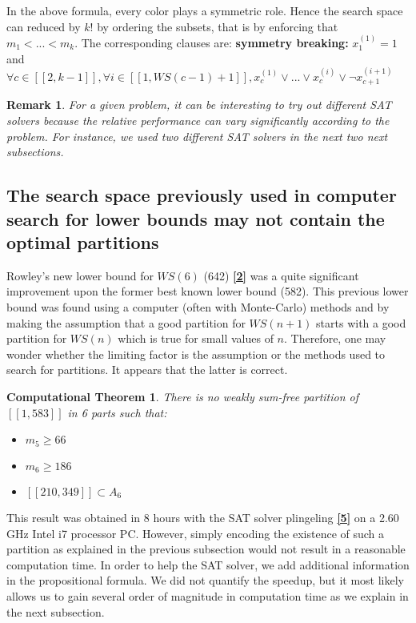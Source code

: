 \documentclass{article}
\newtheorem{computational theorem}{Computational Theorem}[theorem]
\newtheorem{remark}{Remark}[section]
\begin{document}
In the above formula, every color plays a symmetric role. Hence the search space can reduced by \(k!\) by ordering the subsets, that is by 
enforcing that \(m_1 < ... < m_k\). The corresponding clauses are: \linebreak
\textbf{symmetry breaking:}  \(x^{(1)}_1 = 1\) and \(\forall c \in [\![2,k-1]\!], \forall i \in [\![1,WS(c - 1)+1]\!], x^{(1)}_c \lor ... \lor x^{(i)}_c \lor \neg x^{(i+1)}_{c+1}\)

\begin{remark}
For a given problem, it can be interesting to try out different SAT solvers because the relative performance can vary significantly according to the problem. 
For instance, we used two different SAT solvers in the next two next subsections.
\end{remark}


\subsection{The search space previously used in computer search for lower bounds may not contain the optimal partitions}

Rowley's new lower bound for \(WS(6)\) (642)  \hyperlink{label2}{\textbf{[2]}} was a quite significant improvement upon the former 
best known lower bound (582). This previous lower bound was found using a computer (often with Monte-Carlo) methods and by making the 
assumption that a good partition for \(WS(n+1)\) starts with a good partition for \(WS(n)\) which is true for small values of \(n\).
Therefore, one may wonder whether the limiting factor is the assumption or the methods used to search for partitions. It appears that 
the latter is correct.

\begin{computational theorem}
There is no weakly sum-free partition of \([\![1,583]\!]\) in 6 parts such that:
\begin{itemize}
	\item \(m_5 \ge 66\)
	\item \(m_6 \ge 186\)
	\item \([\![210,349]\!] \subset A_6\)
\end{itemize}  
\end{computational theorem}

This result was obtained in 8 hours with the SAT solver plingeling \hyperlink{label5}{\textbf{[5]}} on a 2.60 GHz Intel i7 processor PC.
However, simply encoding the existence of such a partition as explained in the previous subsection would not result in a reasonable 
computation time. In order to help the SAT solver, we add additional information in the propositional formula. We did not quantify the 
speedup, but it most likely allows us to gain several order of magnitude in computation time as we explain in the next subsection.
\end{document}
